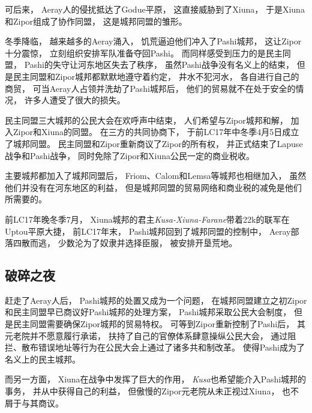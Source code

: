 \documentclass[UTF8,12pt]{ctexbook}
\begin{document}
            可后来，
            Aeray人的侵扰抵达了Godue平原，
            这直接威胁到了Xiuna，
            于是Xiuna和Zipor组成了协作同盟，
            这是城邦同盟的雏形。

            冬季降临，
            越来越多的Aeray涌入，
            饥荒逼迫他们冲入了Pashi城邦，
            这让Zipor十分震惊，
            立刻组织安排军队准备夺回Pashi。
            而同样感受到压力的是民主同盟，
            Pashi的失守让河东地区失去了秩序，
            虽然Pashi战争没有名义上的结束，
            但是民主同盟和Zipor城邦都默默地遵守着约定，
            井水不犯河水，
            各自进行自己的商贸，
            可当Aeray人占领并洗劫了Pashi城邦后，
            他们的贸易就不在处于安全的情况，
            许多人遭受了很大的损失。

            民主同盟三大城邦的公民大会在欢呼声中结束，
            人们希望与Zipor城邦和解，
            加入Zipor和Xiuna的同盟。
            在三方的共同协商下，
            于前LC17年中冬季4月5日成立了城邦同盟。
            民主同盟和Zipor重新商议了Zipor的所有权，
            并正式结束了Lapuse战争和Pashi战争，
            同时免除了Zipor和Xiuna公民一定的商业税收。

            主要城邦都加入了城邦同盟后，
            Friom、Calom和Lemsa等城邦也相继加入，
            虽然他们并没有在河东地区的利益，
            但是城邦同盟的贸易网络和商业税的减免是他们所需要的。

            前LC17年晚冬季7月，
            Xiuna城邦的君主\emph{Kusa-Xiuna-Farane}带着22k的联军在Uptou平原大捷，
            前LC17年末，
            Pashi城邦回到了城邦同盟的控制中，
            Aeray部落四散而逃，
            少数沦为了奴隶并选择臣服，
            被安排开垦荒地。
            \subsection{破碎之夜}
            赶走了Aeray人后，
            Pashi城邦的处置又成为一个问题，
            在城邦同盟建立之初Zipor和民主同盟早已商议好Pashi城邦的处理方案，
            Pashi城邦采取公民大会制度，
            但是民主同盟需要确保Zipor城邦的贸易特权。
            可等到Zipor重新控制了Pashi后，
            其元老院并不愿意履行承诺，
            扶持了自己的官僚体系肆意操纵公民大会，
            通过阻拦、散布错误地址等行为在公民大会上通过了诸多共和制改革。
            使得Pashi成为了名义上的民主城邦。

            而另一方面，
            Xiuna在战争中发挥了巨大的作用，
            \emph{Kusa}也希望能介入Pashi城邦的事务，
            并从中获得自己的利益，
            但傲慢的Zipor元老院从未正视过Xiuna，
            也不屑于与其商议。
\end{document}
